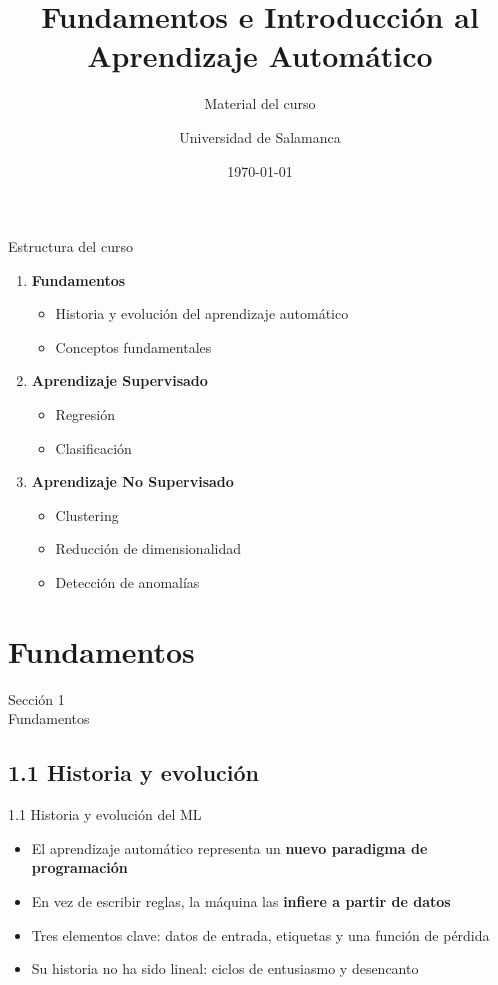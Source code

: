 \documentclass[aspectratio=169]{beamer}
\title[Fundamentos e Introducción al ML]{Fundamentos e Introducción al\\Aprendizaje Automático}
\subtitle{Material del curso}
\author{Universidad de Salamanca}
\institute{Facultades de Ciencias y Ciencias Químicas}
\date{\today}
\begin{document}
\begin{frame}
  \titlepage
\end{frame}

\begin{frame}{Estructura del curso}
  \begin{enumerate}
    \item \textbf{Fundamentos}
    \begin{itemize}
      \item Historia y evolución del aprendizaje automático
      \item Conceptos fundamentales
    \end{itemize}
    \item \textbf{Aprendizaje Supervisado}
    \begin{itemize}
      \item Regresión
      \item Clasificación
    \end{itemize}
    \item \textbf{Aprendizaje No Supervisado}
    \begin{itemize}
      \item Clustering
      \item Reducción de dimensionalidad
      \item Detección de anomalías
    \end{itemize}
  \end{enumerate}
\end{frame}

\section{Fundamentos}
\begin{frame}
  \centering
  {\Huge Sección 1}\\[0.5em]
  {\Large Fundamentos}
\end{frame}

\subsection{1.1 Historia y evolución}

\begin{frame}{1.1 Historia y evolución del ML}
  \begin{itemize}
    \item El aprendizaje automático representa un \textbf{nuevo paradigma de programación}
    \item En vez de escribir reglas, la máquina las \textbf{infiere a partir de datos}
    \item Tres elementos clave: datos de entrada, etiquetas y una función de pérdida
    \item Su historia no ha sido lineal: ciclos de entusiasmo y desencanto
  \end{itemize}
\end{frame}
\end{document}

